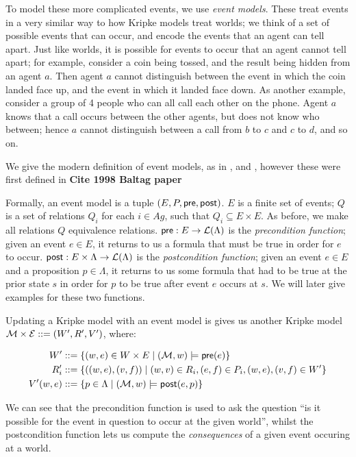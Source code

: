 \documentclass[10pt, a4paper]{report}
\begin{document}
To model these more complicated events, we use \emph{event models}. These
treat events in a very similar way to how Kripke models treat worlds; we think
of a set of possible events that can occur, and encode the events that an agent
can tell apart. Just like worlds, it is possible for events to occur that an
agent cannot tell apart; for example, consider a coin being tossed, and the
result being hidden from an agent $a$. Then agent $a$ cannot distinguish between
the event in which the coin landed face up, and the event in which it landed
face down. As another example, consider a group of 4 people who can all call
each other on the phone. Agent $a$ knows that a call occurs between the other
agents, but does not know who between; hence $a$ cannot distinguish between a
call from $b$ to $c$ and $c$ to $d$, and so on. 

We give the modern definition of event models, as in
\cite{MalvinThesis}, and \cite{AutomataTechniques}, however these were first
defined in \textbf{Cite 1998 Baltag paper}

Formally, an event model  is a tuple $(E, P, \textsf{pre}, \textsf{post})$. $E$ is a finite set
of events; $Q$ is a set of relations $Q_i$ for each $i \in Ag$, such that $Q_i
\subseteq E \times E$. As before, we make all relations $Q$ equivalence
relations. $\textsf{pre} : E \rightarrow \mathcal{L}(\Lambda) $ is the \emph{precondition
  function}; given an event $e \in E$, it returns to us a formula that must be
true in order for $e$ to occur. $\textsf{post} : E \times \Lambda \rightarrow
\mathcal{L}(\Lambda)$ is the \emph{postcondition function}; given an event $e \in
E$ and a proposition $p \in \Lambda$, it returns to us some formula that had to
be true at the prior state $s$ in order for $p$ to be true after event $e$
occurs at $s$. We will later give examples for these two functions. 

Updating a Kripke model  with an event model  is gives us another
Kripke model $\mathcal{M} \times \mathcal{E} ::= (W', R', V')$, where:

\begin{align*}
  W'   &::= \left\{(w, e) \in W \times E \mid (\mathcal{M}, w) \models \textsf{pre}(e)\right\} \\
  R_i' &::= \left\{((w, e), (v, f)) \mid (w, v) \in R_i, (e, f) \in P_i, (w, e), (v, f) \in W' \right\} \\
  V'(w, e) &::= \left\{ p \in \Lambda \mid (\mathcal{M}, w) \models \textsf{post}(e, p) \right\}
\end{align*}

We can see that the precondition function is used to ask the question ``is it
possible for the event in question to occur at the given world'', whilst the
postcondition function lets us compute the \emph{consequences} of a given event
occuring at a world. 
\end{document}
